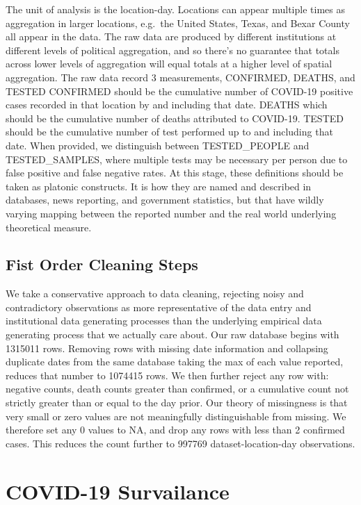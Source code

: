 \documentclass[
]{book}
\begin{document}
The unit of analysis is the location-day. Locations can appear multiple times as aggregation in larger locations, e.g.~the United States, Texas, and Bexar County all appear in the data. The raw data are produced by different institutions at different levels of political aggregation, and so there's no guarantee that totals across lower levels of aggregation will equal totals at a higher level of spatial aggregation. The raw data record 3 measurements, CONFIRMED, DEATHS, and TESTED CONFIRMED should be the cumulative number of COVID-19 positive cases recorded in that location by and including that date. DEATHS which should be the cumulative number of deaths attributed to COVID-19. TESTED should be the cumulative number of test performed up to and including that date. When provided, we distinguish between TESTED\_PEOPLE and TESTED\_SAMPLES, where multiple tests may be necessary per person due to false positive and false negative rates. At this stage, these definitions should be taken as platonic constructs. It is how they are named and described in databases, news reporting, and government statistics, but that have wildly varying mapping between the reported number and the real world underlying theoretical measure.

\hypertarget{fist-order-cleaning-steps}{%
\subsection{Fist Order Cleaning Steps}\label{fist-order-cleaning-steps}}

We take a conservative approach to data cleaning, rejecting noisy and contradictory observations as more representative of the data entry and institutional data generating processes than the underlying empirical data generating process that we actually care about. Our raw database begins with 1315011 rows. Removing rows with missing date information and collapsing duplicate dates from the same database taking the max of each value reported, reduces that number to 1074415 rows. We then further reject any row with: negative counts, death counts greater than confirmed, or a cumulative count not strictly greater than or equal to the day prior. Our theory of missingness is that very small or zero values are not meaningfully distinguishable from missing. We therefore set any 0 values to NA, and drop any rows with less than 2 confirmed cases. This reduces the count further to 997769 dataset-location-day observations.

\hypertarget{covid-19-survailance}{%
\section{COVID-19 Survailance}\label{covid-19-survailance}}
\end{document}
